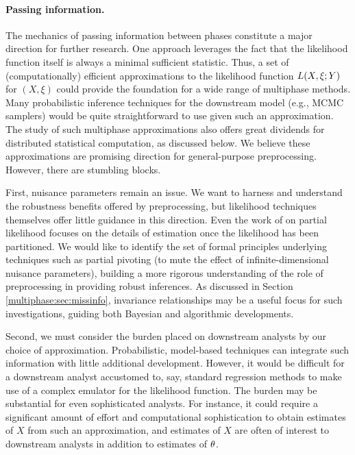 \paragraph{Passing information.}
The mechanics of passing information between phases constitute a major direction for further research.
One approach leverages the fact that the likelihood function itself is always a minimal sufficient statistic.
Thus, a set of (computationally) efficient approximations to the likelihood function $L(X, \xi; Y)$ for $(X, \xi)$ could provide the foundation for a wide range of multiphase methods.
Many probabilistic inference techniques for the downstream model (e.g., MCMC samplers) would be quite straightforward to use given such an approximation.
The study of such multiphase approximations also offers great dividends for distributed statistical computation, as discussed below.
We believe these approximations are promising direction for general-purpose preprocessing.
However, there are stumbling blocks.

First, nuisance parameters remain an issue.
We want to harness and understand the robustness benefits offered by preprocessing, but likelihood techniques themselves offer little guidance in this direction.
Even the work of \citet{Cox1975} on partial likelihood focuses on the details of estimation once the likelihood has been partitioned.
We would like to identify the set of formal principles underlying techniques such as partial pivoting (to mute the effect of infinite-dimensional nuisance parameters), building a more rigorous understanding of the role of preprocessing in providing robust inferences.
As discussed in Section \ref{multiphase:sec:missinfo}, invariance relationships may be a useful focus for such investigations, guiding both Bayesian and algorithmic developments.

Second, we must consider the burden placed on downstream analysts by our choice of approximation.
Probabilistic, model-based techniques can integrate such information with little additional development.
However, it would be difficult for a downstream analyst accustomed to, say, standard regression methods to make use of a complex emulator for the likelihood function.
The burden may be substantial for even sophisticated analysts.
For instance, it could require a significant amount of effort and computational sophistication to obtain estimates of $X$ from such an approximation, and estimates of $X$ are often of interest to downstream analysts in addition to estimates of $\theta$.

